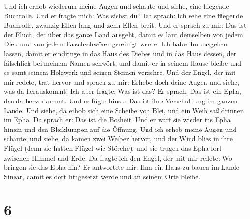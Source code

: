  Und ich erhob wiederum meine Augen und schaute und siehe,
eine fliegende Buchrolle.  Und er fragte mich: Was siehst
du? Ich sprach: Ich sehe eine fliegende Buchrolle, zwanzig Ellen lang
und zehn Ellen breit.  Und er sprach zu mir: Das ist der
Fluch, der über das ganze Land ausgeht, damit es laut demselben von
jedem Dieb und von jedem Falschschwörer gereinigt werde. 
Ich habe ihn ausgehen lassen, damit er eindringe in das Haus des Diebes
und in das Haus dessen, der fälschlich bei meinem Namen schwört, und
damit er in seinem Hause bleibe und es samt seinem Holzwerk und seinen
Steinen verzehre.  Und der Engel, der mit mir redete, trat
hervor und sprach zu mir: Erhebe doch deine Augen und siehe, was da
herauskommt!  Ich aber fragte: Was ist das? Er sprach: Das
ist ein Epha, das da hervorkommt. Und er fügte hinzu: Das ist ihre
Verschuldung im ganzen Lande.  Und siehe, da erhob sich
eine Scheibe von Blei, und ein Weib saß drinnen im Epha. 
Da sprach er: Das ist die Bosheit! Und er warf sie wieder ins Epha
hinein und den Bleiklumpen auf die Öffnung.  Und ich erhob
meine Augen und schaute; und siehe, da kamen zwei Weiber hervor, und der
Wind blies in ihre Flügel (denn sie hatten Flügel wie Störche), und sie
trugen das Epha fort zwischen Himmel und Erde.  Da fragte
ich den Engel, der mit mir redete: Wo bringen sie das Epha hin?
 Er antwortete mir: Ihm ein Haus zu bauen im Lande
Sinear, damit es dort hingesetzt werde und an seinem Orte bleibe.

\hypertarget{section-5}{%
\section{6}\label{section-5}}

